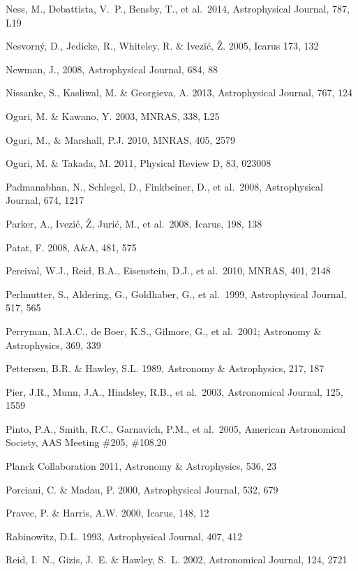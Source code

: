 \documentclass{emulateapj}
\begin{document}
\begin{thebibliography}{}
\bibitem[()]{} Ness, M., Debattista, V.~P., Bensby, T., et al.~2014, Astrophysical Journal, 787, L19

\bibitem[()]{} Nesvorn\'{y}, D., Jedicke, R., Whiteley, R. \& Ivezi\'{c}, \v{Z}. 2005, Icarus 173, 132

\bibitem[()]{} Newman, J., 2008, Astrophysical Journal, 684, 88

\bibitem[()]{} Nissanke, S., Kasliwal, M. \& Georgieva, A. 2013,  Astrophysical Journal, 767, 124 

\bibitem[()]{} Oguri, M. \& Kawano, Y. 2003, MNRAS, 338, L25 

\bibitem[()]{} Oguri, M., \& Marshall, P.J. 2010, MNRAS, 405, 2579

\bibitem[()]{} Oguri, M. \& Takada, M. 2011, Physical Review D, 83, 023008

\bibitem[()]{} Padmanabhan, N., Schlegel, D., Finkbeiner, D., et al.~2008, Astrophysical Journal, 674, 1217

\bibitem[()]{} Parker, A., Ivezi\'{c}, \v{Z}, Juri\'{c}, M., et al.~2008, Icarus, 198, 138

\bibitem[()]{} Patat, F. 2008, A\&A, 481, 575

\bibitem[()]{} Percival, W.J., Reid, B.A., Eisenstein, D.J., et al.~2010, MNRAS, 401, 2148 

\bibitem[()]{} Perlmutter, S., Aldering, G., Goldhaber, G., et al.~1999, Astrophysical Journal, 517, 565

\bibitem[()]{} Perryman, M.A.C., de Boer, K.S., Gilmore, G., et al.~2001; Astronomy \& 
             Astrophysics, 369, 339

\bibitem[()]{} Pettersen, B.R. \& Hawley, S.L. 1989, Astronomy \& Astrophysics, 217, 187

\bibitem[()]{} Pier, J.R., Munn, J.A., Hindsley, R.B., et al.~2003, Astronomical Journal, 125, 1559

\bibitem[()]{} Pinto, P.A., Smith, R.C., Garnavich, P.M., et al.~2005, 
              American Astronomical Society, AAS Meeting \#205, \#108.20

\bibitem[()]{} Planck Collaboration 2011,  Astronomy \& Astrophysics, 536, 23 

\bibitem[()]{} Porciani, C. \& Madau, P. 2000, Astrophysical Journal, 532, 679

\bibitem[()]{} Pravec, P. \& Harris, A.W. 2000, Icarus, 148, 12

\bibitem[()]{} Rabinowitz, D.L. 1993,  Astrophysical Journal, 407, 412

\bibitem[()]{} Reid, I.~N., Gizis, J.~E. \& Hawley, S.~L. 2002,  Astronomical Journal, 124, 2721 


\end{thebibliography}
\end{document}
